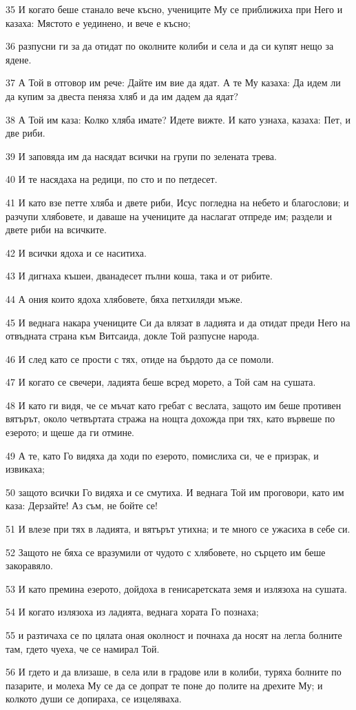 \par 35 И когато беше станало вече късно, учениците Му се приближиха при Него и казаха: Мястото е уединено, и вече е късно;
\par 36 разпусни ги за да отидат по околните колиби и села и да си купят нещо за ядене.
\par 37 А Той в отговор им рече: Дайте им вие да ядат. А те Му казаха: Да идем ли да купим за двеста пеняза хляб и да им дадем да ядат?
\par 38 А Той им каза: Колко хляба имате? Идете вижте. И като узнаха, казаха: Пет, и две риби.
\par 39 И заповяда им да насядат всички на групи по зелената трева.
\par 40 И те насядаха на редици, по сто и по петдесет.
\par 41 И като взе петте хляба и двете риби, Исус погледна на небето и благослови; и разчупи хлябовете, и даваше на учениците да наслагат отпреде им; раздели и двете риби на всичките.
\par 42 И всички ядоха и се наситиха.
\par 43 И дигнаха къшеи, дванадесет пълни коша, така и от рибите.
\par 44 А ония които ядоха хлябовете, бяха петхиляди мъже.
\par 45 И веднага накара учениците Си да влязат в ладията и да отидат преди Него на отвъдната страна към Витсаида, докле Той разпусне народа.
\par 46 И след като се прости с тях, отиде на бърдото да се помоли.
\par 47 И когато се свечери, ладията беше всред морето, а Той сам на сушата.
\par 48 И като ги видя, че се мъчат като гребат с веслата, защото им беше противен вятърът, около четвъртата стража на нощта дохожда при тях, като вървеше по езерото; и щеше да ги отмине.
\par 49 А те, като Го видяха да ходи по езерото, помислиха си, че е призрак, и извикаха;
\par 50 защото всички Го видяха и се смутиха. И веднага Той им проговори, като им каза: Дерзайте! Аз съм, не бойте се!
\par 51 И влезе при тях в ладията, и вятърът утихна; и те много се ужасиха в себе си.
\par 52 Защото не бяха се вразумили от чудото с хлябовете, но сърцето им беше закоравяло.
\par 53 И като премина езерото, дойдоха в генисаретската земя и излязоха на сушата.
\par 54 И когато излязоха из ладията, веднага хората Го познаха;
\par 55 и разтичаха се по цялата оная околност и почнаха да носят на легла болните там, гдето чуеха, че се намирал Той.
\par 56 И гдето и да влизаше, в села или в градове или в колиби, туряха болните по пазарите, и молеха Му се да се допрат те поне до полите на дрехите Му; и колкото души се допираха, се изцеляваха.

